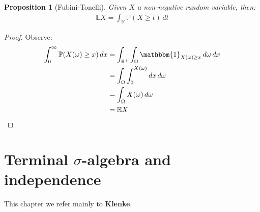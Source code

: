 \documentclass[a4paper,11pt]{book}
\newtheorem{proposition}[theorem]{Proposition}
\theoremstyle{definition}
\theoremstyle{remark}
\begin{document}
\begin{proposition}[Fubini-Tonelli]
	Given $X$ a non-negative random variable, then:
	\begin{align*}
		\mathbb{E} X = \int_{\mathbb{R}} \mathbb{P}(X \geq t) \, dt
	\end{align*}
\end{proposition}
\begin{proof}
Observe:
	\begin{align*}
		\int_0^\infty \mathbb{P}(X(\omega) \geq x) \, dx &= \int_{\mathbb{R}^+} \int_\Omega \mathbbm{1}_{X(\omega) \geq x} \, d\omega \, dx\\
		&= \int_\Omega \int_0^{X(\omega)} dx \, d\omega \\
		&= \int_\Omega X(\omega) \, d\omega \\
	 	&= \mathbb{E} X
	\end{align*}
\end{proof}


\section{Terminal $\sigma$-algebra and independence}
This chapter we refer mainly to \textbf{Klenke}.
\end{document}
